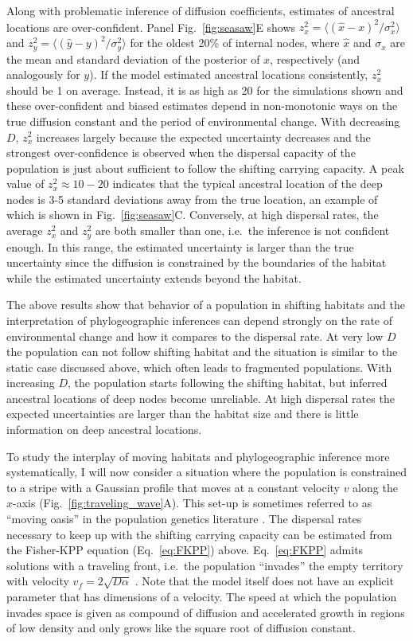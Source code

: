 \documentclass[aps,rmp, twocolumn]{revtex4}
\newcommand{\vfkpp}{v_f}
\begin{document}
Along with problematic inference of diffusion coefficients, estimates of ancestral locations are over-confident.
Panel Fig.~\ref{fig:seasaw}E shows $z_x^2 = \langle (\hat{x} - x)^2/\sigma_x^2 \rangle$ and $z_y^2=\langle (\hat{y} - y)^2/\sigma_y^2\rangle$ for the oldest 20\% of internal nodes, where $\hat{x}$ and $\sigma_x$ are the mean and standard deviation of the posterior of $x$, respectively (and analogously for $y$).
If the model estimated ancestral locations consistently, $z_x^2$ should be 1 on average.
Instead, it is as high as 20 for the simulations shown and these over-confident and biased estimates depend in non-monotonic ways on the true diffusion constant and the period of environmental change.
With decreasing $D$, $z_x^2$ increases largely because the expected uncertainty decreases and the strongest over-confidence is observed when the dispersal capacity of the population is just about sufficient to follow the shifting carrying capacity.
A peak value of $z_x^2\approx 10-20$ indicates that the typical ancestral location of the deep nodes is 3-5 standard deviations away from the true location, an example of which is shown in Fig.~\ref{fig:seasaw}C.
Conversely, at high dispersal rates, the average $z_x^2$ and $z_y^2$ are both smaller than one, i.e.~the inference is not confident enough.
In this range, the estimated uncertainty is larger than the true uncertainty since the diffusion is constrained by the boundaries of the habitat while the estimated uncertainty extends beyond the habitat.

The above results show that behavior of a population in shifting habitats and the interpretation of phylogeographic inferences can depend strongly on the rate of environmental change and how it compares to the dispersal rate.
At very low $D$ the population can not follow shifting habitat and the situation is similar to the static case discussed above, which often leads to fragmented populations.
With increasing $D$, the population starts following the shifting habitat, but inferred ancestral locations of deep nodes become unreliable.
At high dispersal rates the expected uncertainties are larger than the habitat size and there is little information on deep ancestral locations.

To study the interplay of moving habitats and phylogeographic inference more systematically, I will now consider a situation where the population is constrained to a stripe with a Gaussian profile that moves at a constant velocity $v$ along the $x$-axis (Fig.~\ref{fig:traveling_wave}A).
This set-up is sometimes referred to as ``moving oasis'' in the population genetics literature \citep{desai_quasispecies_2005}.
The dispersal rates necessary to keep up with the shifting carrying capacity can be estimated from the Fisher-KPP equation (Eq.~\ref{eq:FKPP}) above.
Eq.~\ref{eq:FKPP} admits solutions with a traveling front, i.e.~the population ``invades'' the empty territory with velocity $\vfkpp = 2\sqrt{D \alpha}$ \citep{fisher_wave_1937,KPP1937,hallatschek_life_2010}.
Note that the model itself does not have an explicit parameter that has dimensions of a velocity.
The speed at which the population invades space is given as compound of diffusion and accelerated growth in regions of low density and only grows like the square root of diffusion constant.
\end{document}

